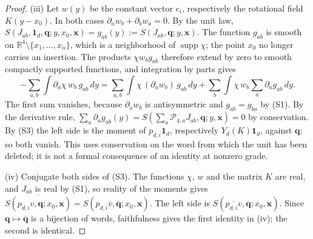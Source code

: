 \begin{proof}
(iii) Let $w(y)$ be the constant vector $e_i$, respectively the
rotational field $K(y-x_0)$.  In both cases $\partial_aw_b+\partial_bw_a=0$.
By the unit law,
$S(J_{ab},\mathbf 1_d,\boldsymbol q;y,x_0,\boldsymbol x)
=g_{ab}(y):=S(J_{ab},\boldsymbol q;y,\boldsymbol x)$.  The function
$g_{ab}$ is smooth on $\mathbb R^4\setminus\{x_1,\ldots,x_n\}$, which is a
neighborhood of $\operatorname{supp}\chi$; the point $x_0$ no longer
carries an insertion.  The products $\chi w_bg_{ab}$ therefore extend by
zero to smooth compactly supported functions, and integration by parts
gives
\[
 -\sum_{a,b}\int\partial_a\chi\,w_b\,g_{ab}\,dy
 =\sum_{a,b}\int\chi\,(\partial_aw_b)\,g_{ab}\,dy
  +\sum_b\int\chi\,w_b\sum_a\partial_ag_{ab}\,dy.
\]
The first sum vanishes, because $\partial_aw_b$ is antisymmetric and
$g_{ab}=g_{ba}$ by (S1).  By the derivative rule,
$\sum_a\partial_ag_{ab}(y)
=S(\sum_a\mathcal P_{4,a}J_{ab},\boldsymbol q;y,\boldsymbol x)=0$ by
conservation.  By (S3) the left side is the moment of $p_{d,i}\mathbf 1_d$,
respectively $Y_d(K)\mathbf 1_d$, against $\boldsymbol q$; so both vanish.
This uses conservation on the word from which the unit has been deleted;
it is not a formal consequence of an identity at nonzero grade.

(iv) Conjugate both sides of (S3).  The functions $\chi$, $w$ and the
matrix $K$ are real, and $J_{ab}$ is real by (S1), so reality of the
moments gives
$\overline{S(p_{d,i}v,\boldsymbol q;x_0,\boldsymbol x)}
=S(p_{d,i}\overline v,\overline{\boldsymbol q};x_0,\boldsymbol x)$.  The
left side is $S(\overline{p_{d,i}v},\overline{\boldsymbol q};x_0,\boldsymbol x)$.
Since $\boldsymbol q\mapsto\overline{\boldsymbol q}$ is a bijection of
words, faithfulness gives the first identity in (iv); the second is
identical.


\end{proof}
